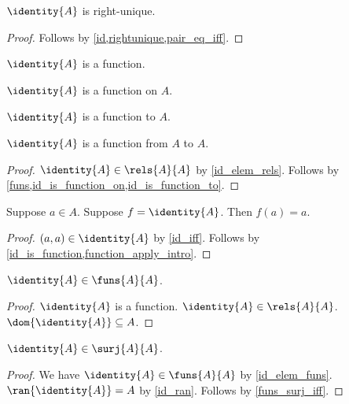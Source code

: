 \begin{proposition}\label{id_rightunique}
    $\identity{A}$ is right-unique.
\end{proposition}
\begin{proof}
    Follows by \cref{id,rightunique,pair_eq_iff}.
\end{proof}

\begin{proposition}\label{id_is_function}
    $\identity{A}$ is a function.
\end{proposition}

\begin{proposition}\label{id_is_function_on}
    $\identity{A}$ is a function on $A$.
\end{proposition}

\begin{proposition}\label{id_is_function_to}
    $\identity{A}$ is a function to $A$.
\end{proposition}

\begin{proposition}\label{id_is_function_from_to}
    $\identity{A}$ is a function from $A$ to $A$.
\end{proposition}
\begin{proof}
    $\identity{A}\in\rels{A}{A}$ by \cref{id_elem_rels}.
    Follows by \cref{funs,id_is_function_on,id_is_function_to}.
\end{proof}

\begin{proposition}\label{id_apply}
    Suppose $a\in A$.
    Suppose $f = \identity{A}$.
    Then $f(a) = a$.
\end{proposition}
\begin{proof}
    $(a,a)\in\identity{A}$ by \cref{id_iff}.
    Follows by \cref{id_is_function,function_apply_intro}.
\end{proof}

\begin{proposition}\label{id_elem_funs}
    $\identity{A}\in\funs{A}{A}$.
\end{proposition}
\begin{proof}
    $\identity{A}$ is a function.
    $\identity{A}\in\rels{A}{A}$.
    $\dom{\identity{A}}\subseteq A$.
\end{proof}


\begin{proposition}\label{id_elem_surjections}
    $\identity{A}\in\surj{A}{A}$.
\end{proposition}
\begin{proof}
    We have $\identity{A}\in\funs{A}{A}$ by \cref{id_elem_funs}.
    $\ran{\identity{A}}=A$ by \cref{id_ran}.
    Follows by \cref{funs_surj_iff}.
\end{proof}

